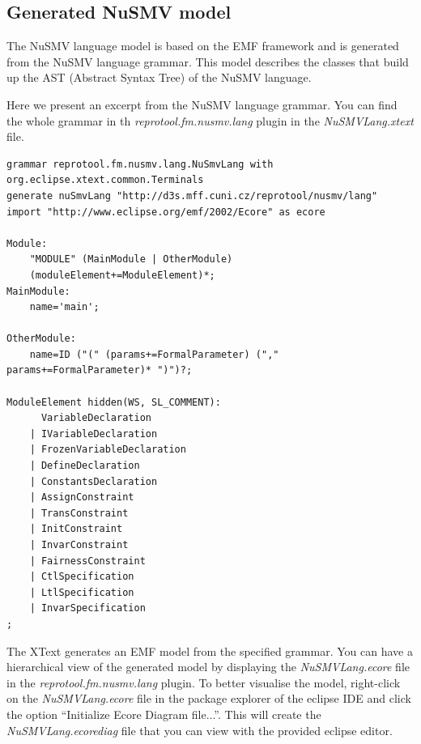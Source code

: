 \subsection{Generated NuSMV model}

The NuSMV language model is based on the EMF framework and is generated from the NuSMV language grammar.
This model describes the classes that build up the AST (Abstract Syntax Tree) of the NuSMV language.

Here we present an excerpt from the NuSMV language grammar. You can find the whole grammar in th
\emph{reprotool.fm.nusmv.lang} plugin in the \emph{NuSMVLang.xtext} file.

\begin{lstlisting}[language=XtextGrammar]
grammar reprotool.fm.nusmv.lang.NuSmvLang with org.eclipse.xtext.common.Terminals
generate nuSmvLang "http://d3s.mff.cuni.cz/reprotool/nusmv/lang"
import "http://www.eclipse.org/emf/2002/Ecore" as ecore

Module:
	"MODULE" (MainModule | OtherModule)
	(moduleElement+=ModuleElement)*;
MainModule:
	name='main';

OtherModule:
	name=ID ("(" (params+=FormalParameter) ("," params+=FormalParameter)* ")")?;

ModuleElement hidden(WS, SL_COMMENT):
	  VariableDeclaration
	| IVariableDeclaration
	| FrozenVariableDeclaration
	| DefineDeclaration
	| ConstantsDeclaration
	| AssignConstraint
	| TransConstraint
	| InitConstraint
	| InvarConstraint
	| FairnessConstraint
	| CtlSpecification
	| LtlSpecification
	| InvarSpecification
;
\end{lstlisting}

The XText generates an EMF model from the specified grammar. You can have a hierarchical view of the generated model by displaying the
\emph{NuSMVLang.ecore} file in the \emph{reprotool.fm.nusmv.lang} plugin. To better visualise the model, right-click on the \emph{NuSMVLang.ecore} file in
the package explorer of the eclipse IDE and click the option ``Initialize Ecore Diagram file...''. This will create the \emph{NuSMVLang.ecorediag} file that you can view with the provided eclipse editor.

